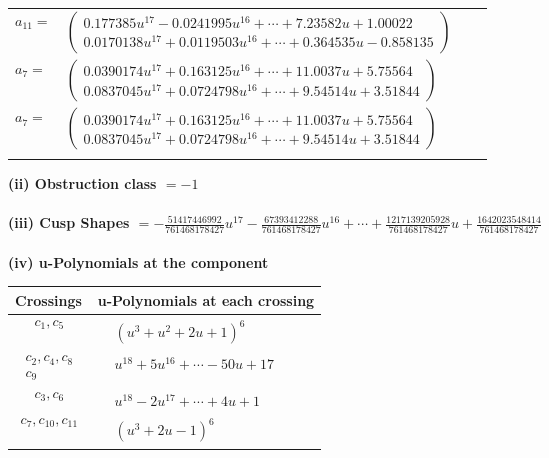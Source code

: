 \documentclass[1p]{elsarticle_modified}
\theoremstyle{definition}
\begin{document}
\begin{tabular}{m{7pt} m{180pt} m{7pt} m{180pt} }
\flushright $a_{11}=$&$\begin{pmatrix}0.177385 u^{17}-0.0241995 u^{16}+\cdots+7.23582 u+1.00022\\0.0170138 u^{17}+0.0119503 u^{16}+\cdots+0.364535 u-0.858135\end{pmatrix}$ \\
\flushright $a_{7}=$&$\begin{pmatrix}0.0390174 u^{17}+0.163125 u^{16}+\cdots+11.0037 u+5.75564\\0.0837045 u^{17}+0.0724798 u^{16}+\cdots+9.54514 u+3.51844\end{pmatrix}$\\ \flushright $a_{7}=$&$\begin{pmatrix}0.0390174 u^{17}+0.163125 u^{16}+\cdots+11.0037 u+5.75564\\0.0837045 u^{17}+0.0724798 u^{16}+\cdots+9.54514 u+3.51844\end{pmatrix}$\\&\end{tabular}
\flushleft \textbf{(ii) Obstruction class $= -1$}\\~\\
\flushleft \textbf{(iii) Cusp Shapes $= -\frac{51417446992}{761468178427} u^{17}-\frac{67393412288}{761468178427} u^{16}+\cdots+\frac{1217139205928}{761468178427} u+\frac{1642023548414}{761468178427}$}\\~\\
\newpage\renewcommand{\arraystretch}{1}
\flushleft \textbf{(iv) u-Polynomials at the component}\newline \\
\begin{tabular}{m{50pt}|m{274pt}}
Crossings & \hspace{64pt}u-Polynomials at each crossing \\
\hline $$\begin{aligned}c_{1},c_{5}\end{aligned}$$&$\begin{aligned}
&(u^3+u^2+2 u+1)^6
\end{aligned}$\\
\hline $$\begin{aligned}c_{2},c_{4},c_{8}\\c_{9}\end{aligned}$$&$\begin{aligned}
&u^{18}+5 u^{16}+\cdots-50 u+17
\end{aligned}$\\
\hline $$\begin{aligned}c_{3},c_{6}\end{aligned}$$&$\begin{aligned}
&u^{18}-2 u^{17}+\cdots+4 u+1
\end{aligned}$\\
\hline $$\begin{aligned}c_{7},c_{10},c_{11}\end{aligned}$$&$\begin{aligned}
&(u^3+2 u-1)^6
\end{aligned}$\\
\hline
\end{tabular}\\~\\
\end{document}
